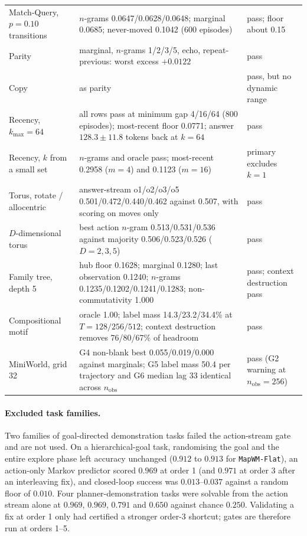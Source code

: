 \documentclass[10pt]{article}
\newcommand{\arm}[1]{\texttt{#1}}
\begin{document}
\begin{table}[h]
\begin{tabular}{@{}p{3.3cm}p{8.2cm}p{3.1cm}@{}}
Match-Query, $p=0.10$ transitions & $n$-grams 0.0647/0.0628/0.0648; marginal 0.0685; never-moved 0.1042 (600 episodes) & pass; floor about 0.15 \\
Parity & marginal, $n$-grams 1/2/3/5, echo, repeat-previous: worst excess $+0.0122$ & pass \\
Copy & as parity & pass, but no dynamic range \\
Recency, $k_{\max}=64$ & all rows pass at minimum gap 4/16/64 (800 episodes); most-recent floor 0.0771; answer $128.3\pm11.8$ tokens back at $k=64$ & pass \\
Recency, $k$ from a small set & $n$-grams and oracle pass; most-recent 0.2958 ($m=4$) and 0.1123 ($m=16$) & primary excludes $k=1$ \\
Torus, rotate / allocentric & answer-stream o1/o2/o3/o5 0.501/0.472/0.440/0.462 against 0.507, with scoring on moves only & pass \\
$D$-dimensional torus & best action $n$-gram 0.513/0.531/0.536 against majority 0.506/0.523/0.526 ($D=2,3,5$) & pass \\
Family tree, depth 5 & hub floor 0.1628; marginal 0.1280; last observation 0.1240; $n$-grams 0.1235/0.1202/0.1241/0.1283; non-commutativity 1.000 & pass; context destruction pass \\
Compositional motif & oracle 1.00; label mass 14.3/23.2/34.4\% at $T=128/256/512$; context destruction removes 76/80/67\% of headroom & pass \\
MiniWorld, grid 32 & G4 non-blank best 0.055/0.019/0.000 against marginals; G5 label mass 50.4 per trajectory and G6 median lag 33 identical across $n_{\mathrm{obs}}$ & pass (G2 warning at $n_{\mathrm{obs}}=256$) \\
\bottomrule
\end{tabular}
\end{table}

\paragraph{Excluded task families.} Two families of goal-directed demonstration tasks failed the
action-stream gate and are not used. On a hierarchical-goal task, randomising the goal and the entire
explore phase left accuracy unchanged ($0.912$ to $0.913$ for \arm{MapWM-Flat}), an action-only Markov
predictor scored $0.969$ at order 1 (and $0.971$ at order 3 after an interleaving fix), and closed-loop
success was $0.013$--$0.037$ against a random floor of $0.010$. Four planner-demonstration tasks were solvable
from the action stream alone at $0.969$, $0.969$, $0.791$ and $0.650$ against chance $0.250$. Validating a
fix at order 1 only had certified a stronger order-3 shortcut; gates are therefore run at orders 1--5.
\end{document}
